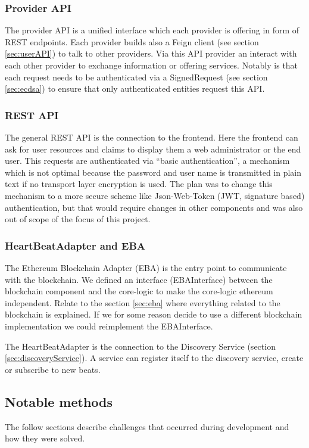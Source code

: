 \subsubsection{Provider API}
\label{sec:providerAPI}
The provider API is a unified interface which each provider is offering in form of REST endpoints. Each provider builds also a Feign client (see section \ref{sec:userAPI}) to talk to other providers.  Via this API provider an interact with each other provider to exchange information or offering services. Notably is that each request needs to be authenticated via a SignedRequest (see section \ref{sec:ecdsa}) to ensure that only authenticated entities request this API. 

\subsubsection{REST API}
The general REST API is the connection to the frontend. Here the frontend can ask for user resources and claims to display them a web administrator or the end user. This requests are authenticated via “basic authentication”, a mechanism which is not optimal because the password and user name is transmitted in plain text if no transport layer encryption is used. The plan was to change this mechanism to a more secure scheme like Json-Web-Token (JWT, signature based) authentication, but that would require changes in other components and was also out of scope of the focus of this project. 

\subsubsection{HeartBeatAdapter and EBA}
The Ethereum Blockchain Adapter (EBA) is the entry point to communicate with the blockchain. We defined an interface (EBAInterface) between the blockchain component and the core-logic to make the core-logic ethereum independent. Relate to the section \ref{sec:eba} where everything related to the blockchain is explained. If we for some reason decide to use a different blockchain implementation we could reimplement the EBAInterface.

The HeartBeatAdapter is the connection to the Discovery Service (section \ref{sec:discoveryService}). A service can register itself to the discovery service, create or subscribe to new beats.

\subsection{Notable methods}
The follow sections describe challenges that occurred during development and how they were solved. 

